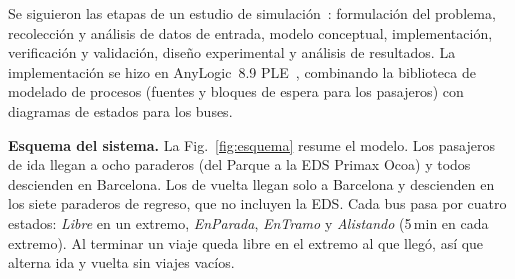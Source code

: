 \documentclass[runningheads]{llncs}
\begin{document}
Se siguieron las etapas de un estudio de simulación~\cite{law2015,banks2010}: formulación del problema, recolección y análisis de datos de entrada, modelo conceptual, implementación, verificación y validación, diseño experimental y análisis de resultados. La implementación se hizo en AnyLogic~8.9 PLE~\cite{borshchev2013}, combinando la biblioteca de modelado de procesos (fuentes y bloques de espera para los pasajeros) con diagramas de estados para los buses.

\textbf{Esquema del sistema.} La Fig.~\ref{fig:esquema} resume el modelo. Los pasajeros de ida llegan a ocho paraderos (del Parque a la EDS Primax Ocoa) y todos descienden en Barcelona. Los de vuelta llegan solo a Barcelona y descienden en los siete paraderos de regreso, que no incluyen la EDS. Cada bus pasa por cuatro estados: \emph{Libre} en un extremo, \emph{EnParada}, \emph{EnTramo} y \emph{Alistando} (5\,min en cada extremo). Al terminar un viaje queda libre en el extremo al que llegó, así que alterna ida y vuelta sin viajes vacíos.
\end{document}
